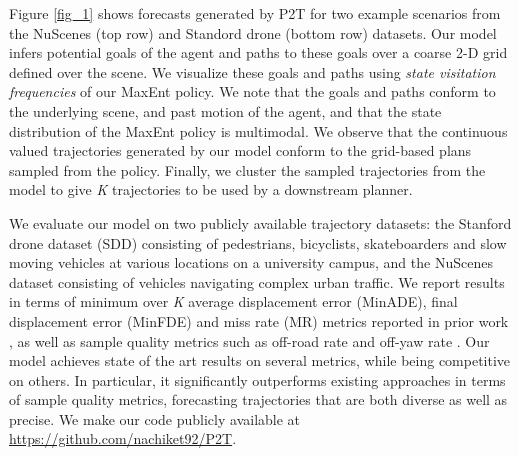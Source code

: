 \documentclass[journal]{IEEEtran}
\begin{document}
Figure \ref{fig_1} shows forecasts generated by P2T for two example scenarios from the NuScenes \cite{caesar2019nuscenes} (top row) and Standord drone \cite{robicquet2016learning} (bottom row) datasets. Our model infers potential goals of the agent and paths to these goals over a coarse 2-D grid defined over the scene. We visualize these goals and paths using \textit{state visitation frequencies} of our MaxEnt policy. We note that the goals and paths conform to the underlying scene, and past motion of the agent, and that the state distribution of the MaxEnt policy is multimodal. We observe that the continuous valued trajectories generated by our model conform to the grid-based plans sampled from the policy. Finally, we cluster the sampled trajectories from the model to give \textit{K} trajectories to be used by a downstream planner.   



We evaluate our model on two publicly available trajectory datasets: the Stanford drone dataset \cite{robicquet2016learning} (SDD) consisting of pedestrians, bicyclists, skateboarders and slow moving vehicles at various locations on a university campus, and the NuScenes dataset \cite{caesar2020nuscenes} consisting of vehicles navigating complex urban traffic. We report results in terms of minimum over \textit{K} average displacement error (MinADE), final displacement error (MinFDE) and miss rate (MR) metrics reported in prior work \cite{gupta2018social, lee2017desire, sadeghian2018sophie, rhinehart2019precog, zhao2019multi, chang2019argoverse}, as well as sample quality metrics such as off-road rate \cite{niedoba2019improving} and off-yaw rate \cite{greer2020trajectory}. Our model achieves state of the art results on several metrics, while being competitive on others. In particular, it significantly outperforms existing approaches in terms of sample quality metrics, forecasting trajectories that are both diverse as well as precise. We make our code publicly available at \href{https://github.com/nachiket92/P2T}{https://github.com/nachiket92/P2T}. 






















 
\end{document}

